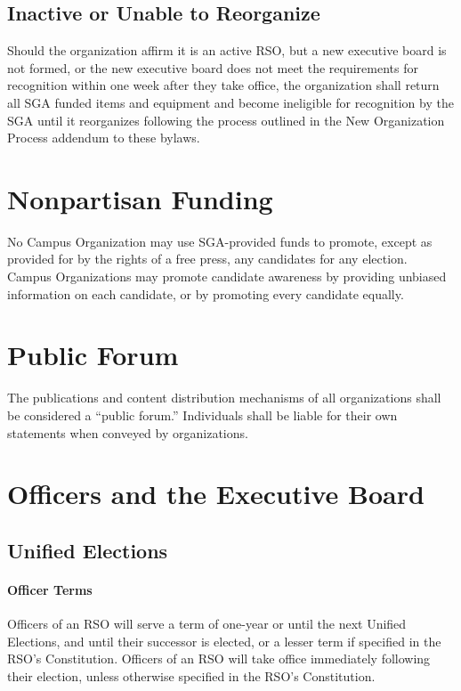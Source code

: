\documentclass[12pt]{scrreprt}
\begin{document}
\subsection{Inactive or Unable to Reorganize}
Should the organization affirm it is an active RSO, but a new executive board 
is not formed, or the new executive board does not meet the requirements for 
recognition within one week after they take office, the organization shall 
return all SGA funded items and equipment and become ineligible for 
recognition by the SGA until it reorganizes following the process outlined in the New Organization Process addendum to these bylaws.

\section{Nonpartisan Funding}
No Campus Organization may use SGA-provided funds to promote, except as 
provided for by the rights of a free press, any candidates for any election. 
Campus Organizations may promote candidate awareness by providing unbiased 
information on each candidate, or by promoting every candidate equally.

\section{Public Forum}
The publications and content distribution mechanisms of all organizations 
shall be considered a ``public forum.'' Individuals shall be liable for their 
own statements when conveyed by organizations.

\section{Officers and the Executive Board}

\subsection{Unified Elections}

\paragraph{Officer Terms}
Officers of an RSO will serve a term of one-year or until the next
Unified Elections, and until their successor is elected, or a lesser
term if specified in the RSO’s Constitution. Officers of an RSO will
take office immediately following their election, unless otherwise
specified in the RSO’s Constitution.
\end{document}
